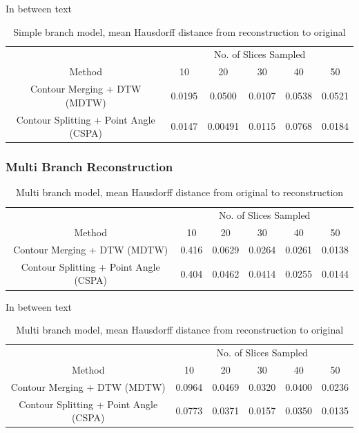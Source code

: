 \documentclass[11p, titlepage]{article}
\begin{document}
In between text

\begin{table}[h]
\begin{tabular}{ | c | c | c | c | c | c | }
\hline
& \multicolumn{5}{c|}{No. of Slices Sampled} \\
\cline{2-6}
Method & 10 & 20 & 30 & 40 & 50 \\
\hline
Contour Merging + DTW (MDTW) & 0.0195 & 0.0500 & 0.0107 & 0.0538 & 0.0521 \\
Contour Splitting + Point Angle (CSPA) & 0.0147 & 0.00491 & 0.0115 & 0.0768 & 0.0184 \\
\hline
\end{tabular}
\caption{Simple branch model, mean Hausdorff distance from reconstruction to original}
\label{table:simple_branch_reverse}
\end{table}

\subsubsection{Multi Branch Reconstruction}

\begin{table}[h]
\begin{tabular}{ | c | c | c | c | c | c | }
\hline
& \multicolumn{5}{c|}{No. of Slices Sampled} \\
\cline{2-6}
Method & 10 & 20 & 30 & 40 & 50 \\
\hline
Contour Merging + DTW (MDTW) & 0.416 & 0.0629 & 0.0264 & 0.0261 & 0.0138 \\
Contour Splitting + Point Angle (CSPA) & 0.404 & 0.0462 & 0.0414 & 0.0255 & 0.0144 \\
\hline
\end{tabular}
\caption{Multi branch model, mean Hausdorff distance from original to reconstruction}
\label{table:multi_branch_forward}
\end{table}

In between text

\begin{table}[h]
\begin{tabular}{ | c | c | c | c | c | c | }
\hline
& \multicolumn{5}{c|}{No. of Slices Sampled} \\
\cline{2-6}
Method & 10 & 20 & 30 & 40 & 50 \\
\hline
Contour Merging + DTW (MDTW) & 0.0964 & 0.0469 & 0.0320 & 0.0400 & 0.0236 \\
Contour Splitting + Point Angle (CSPA) & 0.0773 & 0.0371 & 0.0157 & 0.0350 & 0.0135 \\
\hline
\end{tabular}
\caption{Multi branch model, mean Hausdorff distance from reconstruction to original}
\label{table:multi_branch_reverse}
\end{table}
\end{document}
